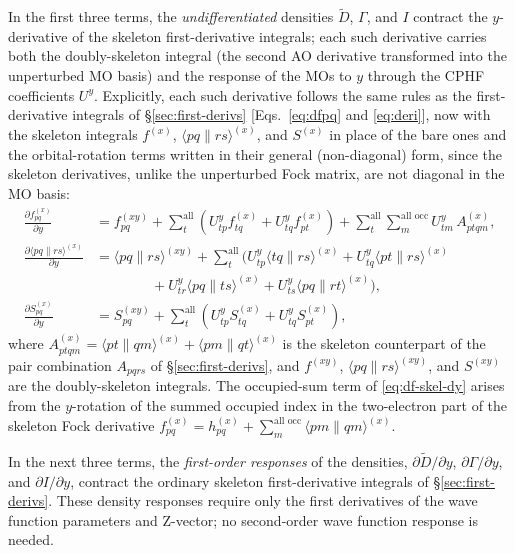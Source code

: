 \documentclass[12pt]{article}
\newcommand{\adb}[2]{\langle #1 \| #2 \rangle}
\newcommand{\so}{\text{all}}
\newcommand{\alloc}{\text{all occ}}   %
\begin{document}
In the first three terms, the {\em undifferentiated} densities $\tilde D$,
$\Gamma$, and $I$ contract the $y$-derivative of the skeleton first-derivative
integrals; each such derivative carries both the doubly-skeleton integral (the
second AO derivative transformed into the unperturbed MO basis) and the
response of the MOs to $y$ through the CPHF coefficients $U^y$.  Explicitly,
each such derivative follows the same rules as the first-derivative integrals of
\S\ref{sec:first-derivs} [Eqs.~\eqref{eq:dfpq} and \eqref{eq:deri}], now with the skeleton integrals
$f^{(x)}$, $\adb{pq}{rs}^{(x)}$, and $S^{(x)}$ in place of the bare ones and the
orbital-rotation terms written in their general (non-diagonal) form, since the
skeleton derivatives, unlike the unperturbed Fock matrix, are not diagonal in
the MO basis:
\begin{align}
\frac{\partial f^{(x)}_{pq}}{\partial y}
&= f^{(xy)}_{pq}
+ \sum_{t}^{\so}\left(U^y_{tp} f^{(x)}_{tq} + U^y_{tq} f^{(x)}_{pt}\right)
+ \sum_{t}^{\so}\sum_{m}^{\alloc} U^y_{tm}\,A^{(x)}_{ptqm},
\label{eq:df-skel-dy}\\
\frac{\partial \adb{pq}{rs}^{(x)}}{\partial y}
&= \adb{pq}{rs}^{(xy)}
+ \sum_{t}^{\so}\Big(U^y_{tp}\adb{tq}{rs}^{(x)} + U^y_{tq}\adb{pt}{rs}^{(x)}
\nonumber\\
&\qquad\qquad
+ U^y_{tr}\adb{pq}{ts}^{(x)} + U^y_{ts}\adb{pq}{rt}^{(x)}\Big),
\label{eq:deri-skel-dy}\\
\frac{\partial S^{(x)}_{pq}}{\partial y}
&= S^{(xy)}_{pq}
+ \sum_{t}^{\so}\left(U^y_{tp} S^{(x)}_{tq} + U^y_{tq} S^{(x)}_{pt}\right),
\label{eq:dS-skel-dy}
\end{align}
where $A^{(x)}_{ptqm}=\adb{pt}{qm}^{(x)}+\adb{pm}{qt}^{(x)}$ is the skeleton
counterpart of the pair combination $A_{pqrs}$ of \S\ref{sec:first-derivs}, and $f^{(xy)}$,
$\adb{pq}{rs}^{(xy)}$, and $S^{(xy)}$ are the doubly-skeleton integrals.  The
occupied-sum term of \eqref{eq:df-skel-dy} arises from the $y$-rotation of the
summed occupied index in the two-electron part of the skeleton Fock derivative
$f^{(x)}_{pq}=h^{(x)}_{pq}+\sum_m^{\alloc}\adb{pm}{qm}^{(x)}$.

In the next three terms, the {\em first-order responses} of the densities,
$\partial\tilde D/\partial y$, $\partial \Gamma/\partial y$, and
$\partial I/\partial y$, contract the ordinary skeleton first-derivative
integrals of \S\ref{sec:first-derivs}.
These density responses require only the first derivatives of
the wave function parameters and Z-vector; no second-order wave function
response is needed.
\end{document}

